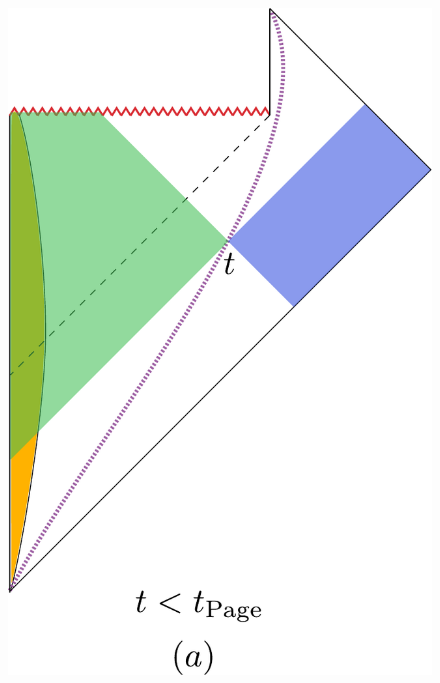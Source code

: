 \begin{figure}[ht]
\begin{center}
\includegraphics[scale=.35]{figures/EWa.pdf} \ \ \ \ \ \  \ \

\end{center}
\end{figure}
